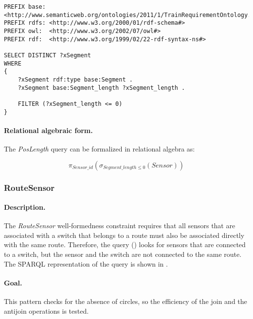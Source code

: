 
\begin{lstlisting}[caption=The PosLength query in SPARQL, label=lst:poslength-sparql]
PREFIX base: <http://www.semanticweb.org/ontologies/2011/1/TrainRequirementOntology.owl#>
PREFIX rdfs: <http://www.w3.org/2000/01/rdf-schema#>
PREFIX owl:  <http://www.w3.org/2002/07/owl#>
PREFIX rdf:  <http://www.w3.org/1999/02/22-rdf-syntax-ns#>

SELECT DISTINCT ?xSegment
WHERE
{
    ?xSegment rdf:type base:Segment .
    ?xSegment base:Segment_length ?xSegment_length .

    FILTER (?xSegment_length <= 0)
}
\end{lstlisting}


\paragraph{Relational algebraic form.} The \textit{PosLength} query can be formalized in relational algebra as:

$$ \pi_{\mathit{Sensor\_id}} \left( \sigma_{\mathit{Segment\_length} \leq 0} \left( \mathit{Sensor} \right) \right) $$

\subsubsection{RouteSensor}

\paragraph{Description.} The \textit{RouteSensor} well-formedness constraint requires that all sensors that are associated with a switch that belongs to a route must also be associated directly with the same route. Therefore, the query () looks for sensors that are connected to a switch, but the sensor and the switch are not connected to the same route. The SPARQL representation of the query is shown in .

\paragraph{Goal.} This pattern checks for the absence of circles, so the efficiency of the join and the antijoin operations is tested.

